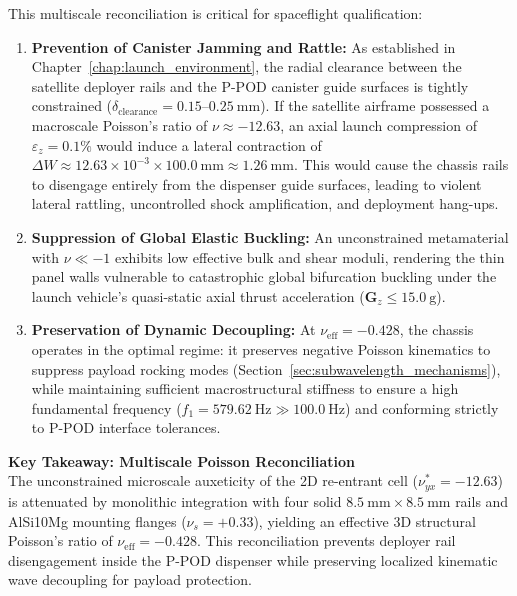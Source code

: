 This multiscale reconciliation is critical for spaceflight qualification:
\begin{enumerate}
\item \textbf{Prevention of Canister Jamming and Rattle:} As established in Chapter~\ref{chap:launch_environment}, the radial clearance between the satellite deployer rails and the P-POD canister guide surfaces is tightly constrained ($\delta_{\text{clearance}} = 0.15\text{--}\SI{0.25}{\milli\meter}$). If the satellite airframe possessed a macroscale Poisson's ratio of $\nu \approx -12.63$, an axial launch compression of $\varepsilon_z = 0.1\%$ would induce a lateral contraction of $\Delta W \approx 12.63 \times 10^{-3} \times \SI{100.0}{\milli\meter} \approx \SI{1.26}{\milli\meter}$. This would cause the chassis rails to disengage entirely from the dispenser guide surfaces, leading to violent lateral rattling, uncontrolled shock amplification, and deployment hang-ups.
\item \textbf{Suppression of Global Elastic Buckling:} An unconstrained metamaterial with $\nu \ll -1$ exhibits low effective bulk and shear moduli, rendering the thin panel walls vulnerable to catastrophic global bifurcation buckling under the launch vehicle's quasi-static axial thrust acceleration ($\mathbf{G}_z \le \SI{15.0}{\text{g}}$).
\item \textbf{Preservation of Dynamic Decoupling:} At $\nu_{\text{eff}} = -0.428$, the chassis operates in the optimal regime: it preserves negative Poisson kinematics to suppress payload rocking modes (Section~\ref{sec:subwavelength_mechanisms}), while maintaining sufficient macrostructural stiffness to ensure a high fundamental frequency ($f_1 = \SI{579.62}{\hertz} \gg \SI{100.0}{\hertz}$) and conforming strictly to P-POD interface tolerances.
\end{enumerate}

\begin{svgraybox}
\textbf{Key Takeaway: Multiscale Poisson Reconciliation} \\
The unconstrained microscale auxeticity of the 2D re-entrant cell ($\nu_{yx}^* = -12.63$) is attenuated by monolithic integration with four solid $\SI{8.5}{\milli\meter} \times \SI{8.5}{\milli\meter}$ rails and AlSi10Mg mounting flanges ($\nu_s = +0.33$), yielding an effective 3D structural Poisson's ratio of $\nu_{\text{eff}} = -0.428$. This reconciliation prevents deployer rail disengagement inside the P-POD dispenser while preserving localized kinematic wave decoupling for payload protection.
\end{svgraybox}

